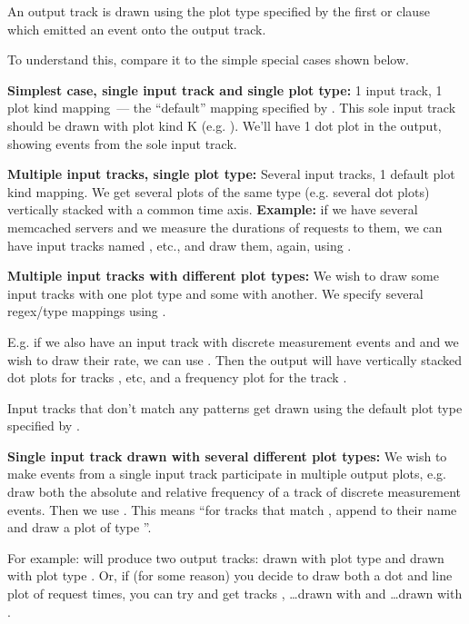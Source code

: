 \documentclass{article}
\begin{document}
An output track is drawn using the plot type specified by the first  or  clause which emitted an event onto the output track.

To understand this, compare it to the simple special cases shown below.


\textbf{Simplest case, single input track and single plot type:} 1 input track, 1 plot kind mapping~--- the ``default'' mapping specified by . This sole input track should be drawn with plot kind K (e.g. ). We'll have 1 dot plot in the output, showing events from the sole input track.

\textbf{Multiple input tracks, single plot type:} Several input tracks, 1 default plot kind mapping. We get several plots of the same type (e.g. several dot plots) vertically stacked with a common time axis. \textbf{Example:} if we have several memcached servers and we measure the durations of requests to them, we can have input tracks named ,  etc., and draw them, again, using .

\textbf{Multiple input tracks with different plot types:} We wish to draw some input tracks with one plot type and some with another. We specify several regex/type mappings using . 

E.g. if we also have an input track  with discrete measurement events  and  and we wish to draw their rate, we can use  . Then the output will have vertically stacked dot plots for tracks ,  etc, and a frequency plot for the track . 

Input tracks that don't match any  patterns get drawn using the default plot type specified by .

\textbf{Single input track drawn with several different plot types:} We wish to make events from a single input track participate in multiple output plots, e.g. draw both the absolute and relative frequency of a track of discrete measurement events. Then we use . This means ``for tracks that match , append  to their name and draw a plot of type ''. 

For example:   will produce two output tracks:  drawn with plot type  and  drawn with plot type . Or, if (for some reason) you decide to draw both a dot and line plot of request times, you can try   and get tracks ,  \ldots drawn with  and \ldots drawn with . 
\end{document}
